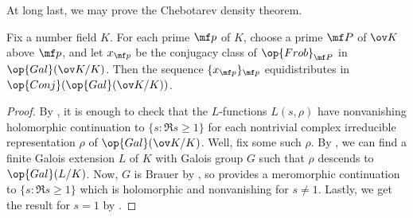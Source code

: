 \documentclass[../thesis.tex]{subfiles}
\begin{document}
At long last, we may prove the Chebotarev density theorem.
\begin{theorem}
	Fix a number field $K$. For each prime $\mf p$ of $K$, choose a prime $\mf P$ of $\ov K$ above $\mf p$, and let $x_{\mf p}$ be the conjugacy class of $\op{Frob}_{\mf P}$ in $\op{Gal}(\ov K/K)$. Then the sequence $\{x_{\mf p}\}_{\mf p}$ equidistributes in $\op{Conj}(\op{Gal}(\ov K/K))$.
\end{theorem}
\begin{proof}
	By , it is enough to check that the $L$-functions $L(s,\rho)$ have nonvanishing holomorphic continuation to $\{s:\Re s\ge1\}$ for each nontrivial complex irreducible representation $\rho$ of $\op{Gal}(\ov K/K)$. Well, fix some such $\rho$. By , we can find a finite Galois extension $L$ of $K$ with Galois group $G$ such that $\rho$ descends to $\op{Gal}(L/K)$. Now, $G$ is Brauer by , so  provides a meromorphic continuation to $\{s:\Re s\ge1\}$ which is holomorphic and nonvanishing for $s\ne1$. Lastly, we get the result for $s=1$ by .
\end{proof}

\end{document}
